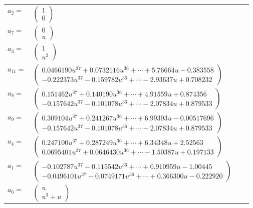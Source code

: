 \documentclass[1p]{elsarticle_modified}
\theoremstyle{definition}
\begin{document}
\begin{tabular}{m{7pt} m{180pt} m{7pt} m{180pt} }
\flushright $a_{2}=$&$\begin{pmatrix}1\\0\end{pmatrix}$ \\
\flushright $a_{7}=$&$\begin{pmatrix}0\\u\end{pmatrix}$ \\
\flushright $a_{3}=$&$\begin{pmatrix}1\\u^2\end{pmatrix}$ \\
\flushright $a_{11}=$&$\begin{pmatrix}0.0466190 u^{37}+0.0732116 u^{36}+\cdots+5.76664 u-0.383558\\-0.222373 u^{37}-0.159782 u^{36}+\cdots-2.93637 u+0.708232\end{pmatrix}$ \\
\flushright $a_{8}=$&$\begin{pmatrix}0.151462 u^{37}+0.140190 u^{36}+\cdots+4.91559 u+0.874356\\-0.157642 u^{37}-0.101078 u^{36}+\cdots-2.07834 u+0.879533\end{pmatrix}$ \\
\flushright $a_{9}=$&$\begin{pmatrix}0.309104 u^{37}+0.241267 u^{36}+\cdots+6.99393 u-0.00517696\\-0.157642 u^{37}-0.101078 u^{36}+\cdots-2.07834 u+0.879533\end{pmatrix}$ \\
\flushright $a_{4}=$&$\begin{pmatrix}0.247100 u^{37}+0.287249 u^{36}+\cdots+6.34348 u+2.52563\\0.0695401 u^{37}+0.0646430 u^{36}+\cdots-1.50387 u+0.197133\end{pmatrix}$ \\
\flushright $a_{1}=$&$\begin{pmatrix}-0.102787 u^{37}-0.115542 u^{36}+\cdots+0.910959 u-1.00445\\-0.0496101 u^{37}-0.0749171 u^{36}+\cdots+0.366300 u-0.222920\end{pmatrix}$ \\
\flushright $a_{6}=$&$\begin{pmatrix}u\\u^3+u\end{pmatrix}$ \\

\end{tabular}
\end{document}
